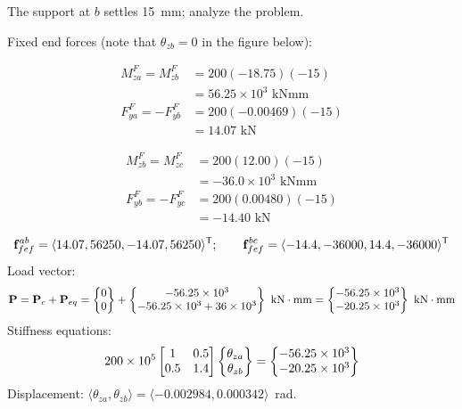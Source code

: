 \begin{example}
The support at $b$ settles 15~mm; analyze the problem.
\begin{fig}
  
\end{fig}
Fixed end forces (note that $\theta_{zb} = 0$ in the figure below):
\begin{fig}
  
\end{fig}
\begin{fig}
  
\end{fig}
\begin{minipage}{0.5\linewidth}
\begin{align*}
  M^F_{za} = M^F_{zb} &= 200(-18.75)(-15)\\ &= 56.25\times10^3\text{ kNmm}\\
  F^F_{ya} = -F^F_{yb} &= 200(-0.00469)(-15)\\ &= 14.07\text{ kN}
\end{align*}
\end{minipage}\hfill
\begin{minipage}{0.48\linewidth}
\begin{align*}
  M^F_{zb} = M^F_{zc} &= 200(12.00)(-15)\\ &= -36.0\times10^3\text{ kNmm}\\
  F^F_{yb} = -F^F_{yc} &= 200(0.00480)(-15)\\ &= -14.40\text{ kN}
\end{align*}
\end{minipage}
\begin{equation*}
  \mathbf{f}^{ab}_{fef} = \langle 14.07, 56250, -14.07, 56250\rangle^{\mathsf{T}};\qquad
  \mathbf{f}^{bc}_{fef} = \langle -14.4, -36000, 14.4, -36000\rangle^{\mathsf{T}}
\end{equation*}
Load vector:
\begin{equation*}
  \mathbf{P} = \mathbf{P}_c + \mathbf{P}_{eq} = \begin{Bmatrix}0\\ 0\end{Bmatrix} + \begin{Bmatrix}-56.25\times10^3\\ -56.25\times10^3 + 36\times10^3\end{Bmatrix}\text{ kN}\cdot\text{mm}
  = \begin{Bmatrix}-56.25\times10^3\\ -20.25\times10^3\end{Bmatrix}\text{ kN}\cdot\text{mm}
\end{equation*}
Stiffness equations:
\begin{equation*}
  200\times10^5\begin{bmatrix}1 & 0.5\\ 0.5 & 1.4\end{bmatrix}\begin{Bmatrix}\theta_{za}\\ \theta_{zb}\end{Bmatrix} = \begin{Bmatrix}-56.25\times10^3\\ -20.25\times10^3\end{Bmatrix}
\end{equation*}
Displacement: $\langle\theta_{za}, \theta_{zb}\rangle = \langle -0.002984, 0.000342\rangle$~rad.


\end{example}
